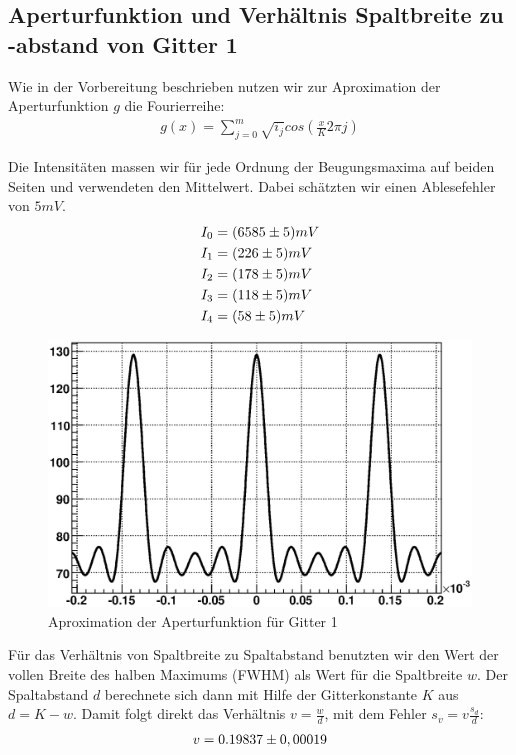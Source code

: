 \documentclass[12pt]{article}
\begin{document}
\subsection{Aperturfunktion und Verhältnis Spaltbreite zu -abstand von Gitter 1}

Wie in der Vorbereitung beschrieben nutzen wir zur Aproximation der Aperturfunktion $g$ die Fourierreihe:
\begin{align}
 g(x) = \sum_{j=0}^{m}{\sqrt{i_j}cos \left( \frac{x}{K} 2 \pi j \right)}
\end{align}

Die Intensitäten massen wir für jede Ordnung der Beugungsmaxima auf beiden Seiten und verwendeten den Mittelwert. Dabei schätzten wir einen Ablesefehler von $5mV$. 
\begin{align}
 \notag
I_0 &= (6585 \pm 5) mV \\
 \notag
I_1 &= (226 \pm 5) mV \\
 \notag
I_2 &= (178 \pm 5) mV \\
 \notag
I_3 &= (118 \pm 5) mV \\
 \notag
I_4 &= (58 \pm 5) mV
\end{align}

\begin{figure}[H]  
\centering
\includegraphics[width=0.7\linewidth]{pictures/apertur.eps}
\caption{Aproximation der Aperturfunktion für Gitter 1}
\end{figure}

Für das Verhältnis von Spaltbreite zu Spaltabstand benutzten wir den Wert der vollen Breite des halben Maximums (FWHM) als Wert für die Spaltbreite $w$. Der Spaltabstand $d$ berechnete sich dann mit Hilfe der Gitterkonstante $K$ aus $d= K - w$. Damit folgt direkt das Verhältnis $v=\frac{w}{d}$, mit dem Fehler $s_v=v\frac{s_d}{d}$:
\begin{align}
 \notag
v=0.19837 \pm 0,00019
\end{align}
\end{document}
